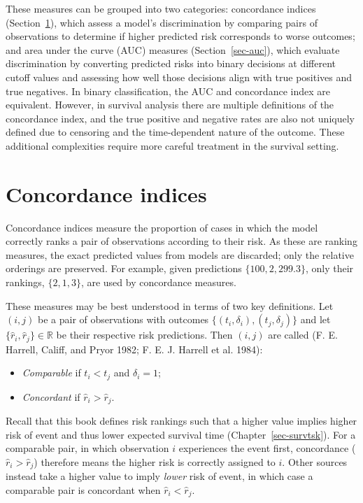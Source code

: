 \documentclass[
  letterpaper,
  krantz2]{style/krantz}
\providecommand{\tightlist}{%
  \setlength{\itemsep}{0pt}\setlength{\parskip}{0pt}}
\begin{document}
These measures can be grouped into two categories: concordance indices
(Section~\ref{sec-cindex}), which assess a
model's discrimination by comparing pairs of observations to determine
if higher predicted risk corresponds to worse outcomes; and area under
the curve (AUC) measures
(Section~\ref{sec-auc}), which evaluate discrimination by converting
predicted risks into binary decisions at different cutoff values and
assessing how well those decisions align with true positives and true
negatives. In binary
classification, the AUC and concordance
index are equivalent. However, in survival analysis there are multiple
definitions of the concordance index, and the true positive and negative
rates are also not uniquely defined due to censoring and the
time-dependent nature of the outcome. These additional complexities
require more careful treatment in the survival setting.

\section{Concordance indices}\label{sec-cindex}

Concordance indices measure the proportion of cases in which the model
correctly ranks a pair of observations according to their
risk. As these are ranking measures, the exact
predicted values from models are discarded; only the relative orderings
are preserved. For example, given predictions \(\{100,2,299.3\}\), only
their rankings, \(\{2,1,3\}\), are used by concordance measures.

These measures may be best understood in terms of two key definitions.
Let \((i,j)\) be a pair of observations with outcomes
\(\{(t_i,\delta_i),(t_j,\delta_j)\}\) and let
\(\{\hat{r}_i, \hat{r}_j\} \in \mathbb{R}\) be their respective risk
predictions. Then \((i,j)\) are called (F. E. Harrell, Califf, and Pryor
1982; F. E. J. Harrell et al. 1984):

\begin{itemize}
\tightlist
\item
  \emph{Comparable} if \(t_i < t_j\) and
  \(\delta_i = 1\);
\item
  \emph{Concordant} if
  \(\hat{r}_i > \hat{r}_j\).
\end{itemize}

Recall that this book defines risk rankings such that a higher value
implies higher risk of event and thus lower expected survival time
(Chapter~\ref{sec-survtsk}). For a comparable pair, in which observation
\(i\) experiences the event first, concordance
(\(\hat{r}_i > \hat{r}_j\)) therefore means the higher risk is correctly
assigned to \(i\). Other sources instead take a higher value to imply
\emph{lower} risk of event, in which case a comparable pair is
concordant when \(\hat{r}_i < \hat{r}_j\).
\end{document}
